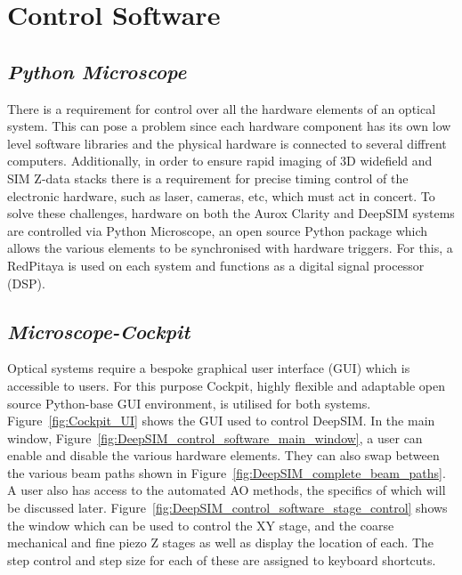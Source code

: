 \section{Control Software}
\label{sec:control_software}

\subsection{\textit{Python Microscope}}
\label{subsec:microscope}

There is a requirement for control over all the hardware elements of an optical system. This can pose a problem since each hardware component has its own low level software libraries and the physical hardware is connected to several diffrent computers. Additionally, in order to ensure rapid imaging of 3D widefield and SIM Z-data stacks there is a requirement for precise timing control of the electronic hardware, such as laser, cameras, etc, which must act in concert. To solve these challenges, hardware on both the Aurox Clarity and DeepSIM systems are controlled via Python Microscope, an open source Python package which allows the various elements to be synchronised with hardware triggers. For this, a RedPitaya is used on each system and functions as a digital signal processor (DSP).

\subsection{\textit{Microscope-Cockpit}}
\label{subsec:cockpit}

Optical systems require a bespoke graphical user interface (GUI) which is accessible to users. For this purpose Cockpit, highly flexible and adaptable open source Python-base GUI environment, is utilised for both systems. Figure~\ref{fig:Cockpit_UI} shows the GUI used to control DeepSIM. In the main window, Figure~\ref{fig:DeepSIM_control_software_main_window}, a user can enable and disable the various hardware elements. They can also swap between the various beam paths shown in Figure~\ref{fig:DeepSIM_complete_beam_paths}. A user also has access to the automated AO methods, the specifics of which will be discussed later. Figure~\ref{fig:DeepSIM_control_software_stage_control} shows the window which can be used to control the XY stage, and the coarse mechanical and fine piezo Z stages as well as display the location of each. The step control and step size for each of these are assigned to keyboard shortcuts. 

